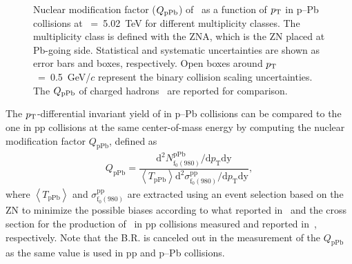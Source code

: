 \begin{figure}[!hbt]
	\centering
	\caption{ Nuclear modification factor ($Q_{\rm{pPb}}$) of \fzero~as a function of $p_{\rm{T}}$ in p--Pb collisions at \snn~=~5.02~TeV for different multiplicity classes. The multiplicity class is defined with the ZNA, which is the ZN placed at Pb-going side. Statistical and systematic uncertainties are shown as error bars and boxes, respectively. Open boxes around $p_{\rm{T}}$~=~0.5~GeV/$c$ represent the binary collision scaling uncertainties. The $Q_{\rm{pPb}}$ of charged hadrons~\cite{ALICE:2014xsp} are reported for comparison. }
	\label{fig:QpPb}
\end{figure}

The $p_{\rm{T}}$-differential invariant yield of \fzero in p--Pb collisions can be compared to the one in pp collisions at the same center-of-mass energy by computing the nuclear modification factor $Q_{\mbox{pPb}}$, defined as 
\begin{eqnarray}
Q_{\mbox{pPb}} = \dfrac{\mathrm{d}^{2} N_{\mathrm{f}_{0}(980)}^{\mathrm{pPb}} / \mathrm{d} p_{\mathrm{T}} \mathrm{dy} }{ \left\langle T_{\mathrm{pPb}} \right\rangle \mathrm{d}^{2} \sigma_{\mathrm{f}_{0}(980)}^{\mathrm{pp}}/ \mathrm{d} p_{\mathrm{T}} \mathrm{dy} },
\end{eqnarray}
where $\left\langle T_{\mathrm{pPb}} \right\rangle$ and $\sigma_{\mathrm{f}_{0}(980)}^{\mathrm{pp}}$ are extracted using an event selection based on the
ZN to minimize the possible biases according to what reported in~\cite{ALICE:2014xsp} and the cross section for the production of \fzero~in pp collisions measured and reported in~\cite{ALICE:2022qnb}, respectively. Note that the B.R. is canceled out in the measurement of the $Q_{\mbox{pPb}}$ as the same value is used in pp and p--Pb collisions.

